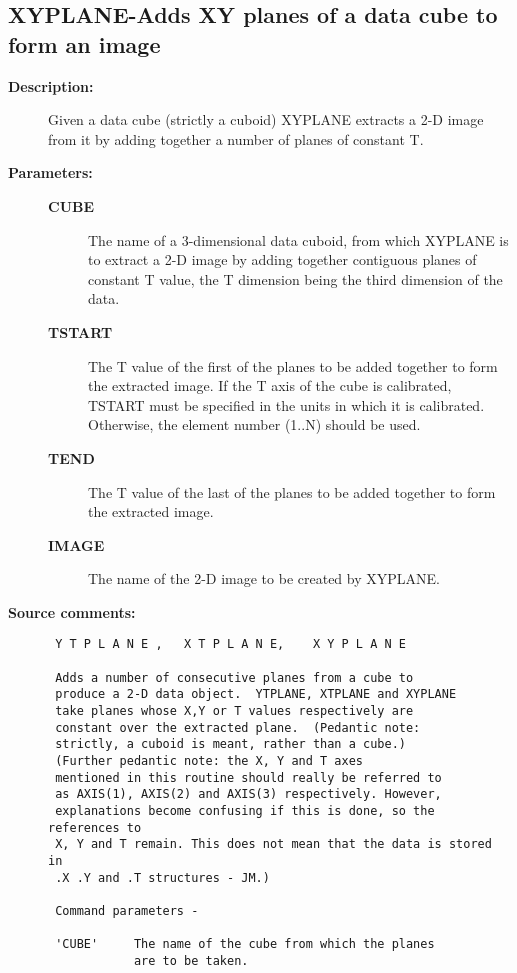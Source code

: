 \subsection{XYPLANE-\label{XYPLANE}Adds XY planes of a data cube to form an image}
\begin{description}

\item [{\bf Description:}]
 Given a data cube (strictly a cuboid) XYPLANE extracts a 2-D image
 from it by adding together a number of planes of constant T.

\item [{\bf Parameters:}]
\begin{description}
\item [{\bf CUBE}]
 The name of a 3-dimensional data cuboid,
 from which XYPLANE is to extract a 2-D image by adding
 together contiguous planes of constant T value, the
 T dimension being the third dimension of the data.
\item [{\bf TSTART}]
 The T value of the first of the planes to
 be added together to form the extracted image.  If
 the T axis of the cube is calibrated, TSTART must be
 specified in the units in which it is calibrated.
 Otherwise, the element number (1..N) should be used.
\item [{\bf TEND}]
 The T value of the last of the planes to
 be added together to form the extracted image.
\item [{\bf IMAGE}]
 The name of the 2-D image to be created by XYPLANE.
\end{description}

\item [{\bf Source comments:}]
\begin{verbatim}
 Y T P L A N E ,   X T P L A N E,    X Y P L A N E

 Adds a number of consecutive planes from a cube to
 produce a 2-D data object.  YTPLANE, XTPLANE and XYPLANE
 take planes whose X,Y or T values respectively are
 constant over the extracted plane.  (Pedantic note:
 strictly, a cuboid is meant, rather than a cube.)
 (Further pedantic note: the X, Y and T axes
 mentioned in this routine should really be referred to
 as AXIS(1), AXIS(2) and AXIS(3) respectively. However,
 explanations become confusing if this is done, so the references to
 X, Y and T remain. This does not mean that the data is stored in
 .X .Y and .T structures - JM.)

 Command parameters -

 'CUBE'     The name of the cube from which the planes
            are to be taken.


\end{verbatim}
\end{description}
